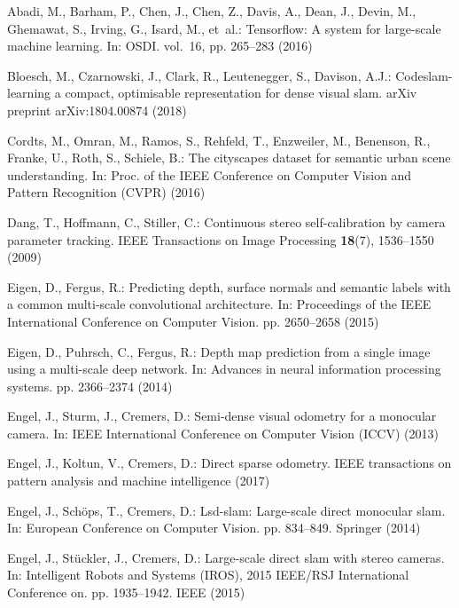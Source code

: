 \documentclass[runningheads]{llncs}
\begin{document}
\clearpage
\begin{thebibliography}{10}
\providecommand{\url}[1]{\texttt{#1}}
\providecommand{\urlprefix}{URL }
\providecommand{\doi}[1]{https://doi.org/#1}

Abadi, M., Barham, P., Chen, J., Chen, Z., Davis, A., Dean, J., Devin, M.,
  Ghemawat, S., Irving, G., Isard, M., et~al.: Tensorflow: A system for
  large-scale machine learning. In: OSDI. vol.~16, pp. 265--283 (2016)

Bloesch, M., Czarnowski, J., Clark, R., Leutenegger, S., Davison, A.J.:
  Codeslam-learning a compact, optimisable representation for dense visual
  slam. arXiv preprint arXiv:1804.00874  (2018)

Cordts, M., Omran, M., Ramos, S., Rehfeld, T., Enzweiler, M., Benenson, R.,
  Franke, U., Roth, S., Schiele, B.: The cityscapes dataset for semantic urban
  scene understanding. In: Proc. of the IEEE Conference on Computer Vision and
  Pattern Recognition (CVPR) (2016)

Dang, T., Hoffmann, C., Stiller, C.: Continuous stereo self-calibration by
  camera parameter tracking. IEEE Transactions on Image Processing
  \textbf{18}(7),  1536--1550 (2009)

Eigen, D., Fergus, R.: Predicting depth, surface normals and semantic labels
  with a common multi-scale convolutional architecture. In: Proceedings of the
  IEEE International Conference on Computer Vision. pp. 2650--2658 (2015)

Eigen, D., Puhrsch, C., Fergus, R.: Depth map prediction from a single image
  using a multi-scale deep network. In: Advances in neural information
  processing systems. pp. 2366--2374 (2014)

Engel, J., Sturm, J., Cremers, D.: Semi-dense visual odometry for a monocular
  camera. In: IEEE International Conference on Computer Vision (ICCV) (2013)

Engel, J., Koltun, V., Cremers, D.: Direct sparse odometry. IEEE transactions
  on pattern analysis and machine intelligence  (2017)

Engel, J., Sch{\"o}ps, T., Cremers, D.: Lsd-slam: Large-scale direct monocular
  slam. In: European Conference on Computer Vision. pp. 834--849. Springer
  (2014)

Engel, J., St{\"u}ckler, J., Cremers, D.: Large-scale direct slam with stereo
  cameras. In: Intelligent Robots and Systems (IROS), 2015 IEEE/RSJ
  International Conference on. pp. 1935--1942. IEEE (2015)


\end{thebibliography}
\end{document}
